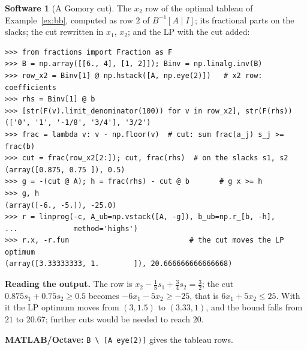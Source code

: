 \documentclass[11pt,a4paper]{article}
\numberwithin{equation}{section}
\theoremstyle{definition}
\newtheorem{software}[thm]{Software}
\begin{document}
\begin{software}[A Gomory cut]
\label{sw:gomory}
The $x_2$ row of the optimal tableau of Example~\ref{ex:bb}, computed as row $2$ of $B^{-1}[A \mid I]$; its fractional parts on the slacks; the cut rewritten in $x_1$, $x_2$; and the LP with the cut added:
{\small\begin{verbatim}
>>> from fractions import Fraction as F
>>> B = np.array([[6., 4], [1, 2]]); Binv = np.linalg.inv(B)
>>> row_x2 = Binv[1] @ np.hstack([A, np.eye(2)])   # x2 row: coefficients
>>> rhs = Binv[1] @ b
>>> [str(F(v).limit_denominator(100)) for v in row_x2], str(F(rhs))
(['0', '1', '-1/8', '3/4'], '3/2')
>>> frac = lambda v: v - np.floor(v)  # cut: sum frac(a_j) s_j >= frac(b)
>>> cut = frac(row_x2[2:]); cut, frac(rhs)  # on the slacks s1, s2
(array([0.875, 0.75 ]), 0.5)
>>> g = -(cut @ A); h = frac(rhs) - cut @ b       # g x >= h
>>> g, h
(array([-6., -5.]), -25.0)
>>> r = linprog(-c, A_ub=np.vstack([A, -g]), b_ub=np.r_[b, -h],
...             method='highs')
>>> r.x, -r.fun                            # the cut moves the LP optimum
(array([3.33333333, 1.        ]), 20.666666666666668)
\end{verbatim}}
\textbf{Reading the output.} The row is $x_2 - \frac18s_1 + \frac34s_2 = \frac32$; the cut $0.875s_1 + 0.75s_2 \geq 0.5$ becomes $-6x_1 - 5x_2 \geq -25$, that is $6x_1 + 5x_2 \leq 25$. With it the LP optimum moves from $(3, 1.5)$ to $(3.33, 1)$, and the bound falls from $21$ to $20.67$; further cuts would be
needed to reach $20$.

\textbf{MATLAB/Octave:} \texttt{B \textbackslash\ [A eye(2)]} gives the tableau rows.
\end{software}
\end{document}
